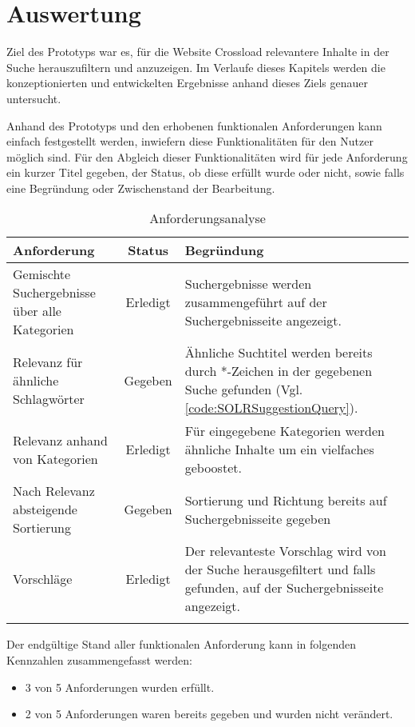 \chapter{Auswertung}
\label{ch:evaluation}
Ziel des Prototyps war es, für die Website Crossload relevantere Inhalte in der Suche herauszufiltern und anzuzeigen.
Im Verlaufe dieses Kapitels werden die konzeptionierten und entwickelten Ergebnisse anhand dieses Ziels genauer untersucht.

Anhand des Prototyps und den erhobenen funktionalen Anforderungen kann einfach festgestellt werden, inwiefern diese Funktionalitäten für den Nutzer möglich sind.
Für den Abgleich dieser Funktionalitäten wird für jede Anforderung ein kurzer Titel gegeben, der Status, ob diese erfüllt wurde oder nicht, sowie falls eine Begründung oder Zwischenstand der Bearbeitung.

\begin{longtable}{p{}|c|p{}}
  \label{tab:requirements}\\
  \textbf{Anforderung} & \textbf{Status} & \textbf{Begründung} \\
  \hline
  \hline
  Gemischte Suchergebnisse über alle Kategorien & Erledigt & Suchergebnisse werden zusammengeführt auf der Suchergebnisseite angezeigt. \\
  \hline

  Relevanz für ähnliche Schlagwörter & Gegeben & Ähnliche Suchtitel werden bereits durch *-Zeichen in der gegebenen Suche gefunden (Vgl. \ref{code:SOLRSuggestionQuery}). \\
  \hline

  Relevanz anhand von Kategorien & Erledigt & Für eingegebene Kategorien werden ähnliche Inhalte um ein vielfaches geboostet. \\
  \hline

  Nach Relevanz absteigende Sortierung & Gegeben & Sortierung und Richtung bereits auf Suchergebnisseite gegeben \\
  \hline

  Vorschläge & Erledigt & Der relevanteste Vorschlag wird von der Suche herausgefiltert und falls gefunden, auf der Suchergebnisseite angezeigt. \\
  \caption{Anforderungsanalyse}
\end{longtable}

Der endgültige Stand aller funktionalen Anforderung kann in folgenden Kennzahlen zusammengefasst werden:
\begin{itemize}
  \item 3 von 5 Anforderungen wurden erfüllt.
  \item 2 von 5 Anforderungen waren bereits gegeben und wurden nicht verändert.
\end{itemize}
